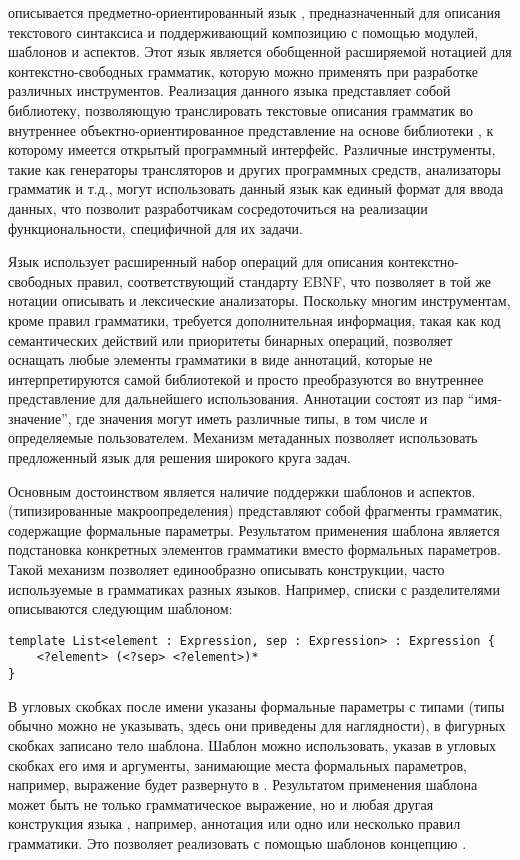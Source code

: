  описывается предметно-ориентированный язык \GRM{}, предназначенный для описания текстового синтаксиса и поддерживающий композицию с помощью модулей, шаблонов и аспектов. 
Этот язык является обобщенной
расширяемой нотацией для контекстно-свободных грамматик, которую можно применять при разработке различных инструментов. Реализация данного языка представляет собой библиотеку, позволяющую транслировать текстовые описания грамматик во внутреннее объектно-ориентированное представление на основе библиотеки , к которому имеется открытый программный интерфейс. 
Различные инструменты, такие как генераторы трансляторов и других программных средств, анализаторы грамматик и т.д., могут использовать данный язык как единый формат для ввода данных, что позволит разработчикам сосредоточиться на реализации функциональности, специфичной для их задачи. 

Язык \GRM{} использует расширенный набор операций для описания контекстно-свободных правил, соответствующий стандарту EBNF, что позволяет в той же нотации описывать и лексические анализаторы. Поскольку многим инструментам, кроме правил грамматики, требуется дополнительная информация, такая как код семантических действий или приоритеты бинарных операций, \GRM{} позволяет оснащать любые элементы грамматики  в виде аннотаций, которые не интерпретируются самой библиотекой и просто преобразуются во внутреннее представление для дальнейшего использования. Аннотации состоят из пар ``имя-значение'', где значения могут иметь различные типы, в том числе и определяемые пользователем. Механизм метаданных позволяет использовать предложенный язык для решения широкого круга задач.

Основным достоинством \GRM{} является наличие поддержки шаблонов и аспектов.
 (типизированные макроопределения) представляют собой фрагменты грамматик, содержащие формальные параметры. Результатом применения шаблона является подстановка конкретных элементов грамматики вместо формальных параметров. Такой механизм позволяет единообразно описывать конструкции, часто используемые в грамматиках разных языков. Например, списки с разделителями описываются следующим шаблоном:
\begin{lstlisting}
template List<element : Expression, sep : Expression> : Expression {
	<?element> (<?sep> <?element>)*
}
\end{lstlisting}
В угловых скобках после имени  указаны формальные параметры с типами (типы обычно можно не указывать, здесь они приведены для наглядности), в фигурных скобках записано тело шаблона. 
Шаблон можно использовать, указав в угловых скобках его имя и аргументы, занимающие места формальных параметров, например, выражение  будет развернуто в . Результатом применения шаблона может быть не только грамматическое выражение, но и любая другая конструкция языка \GRM{}, например, аннотация или одно или несколько правил грамматики. Это позволяет реализовать с помощью шаблонов концепцию . 

